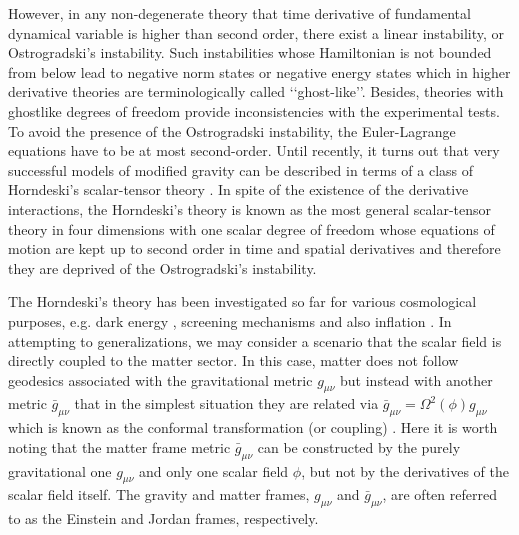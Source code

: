 \documentclass[aps,prd,amsmath,amssymb,preprintnumbers,onecolumn,11pt,nofootinbib]{revtex4}
\begin{document}
However, in any non-degenerate theory that time derivative of fundamental dynamical variable is higher than second order, there exist a linear instability, or Ostrogradski's instability. Such instabilities whose Hamiltonian is not bounded from below lead to negative norm states or negative energy states which in higher derivative theories are terminologically called \lq\lq ghost-like\rq\rq. Besides, theories with ghostlike degrees of freedom provide inconsistencies with the experimental tests. To avoid the presence of the Ostrogradski instability, the Euler-Lagrange equations have to be at most second-order. Until recently, it turns out that very successful models of modified gravity can be described in terms of a class of Horndeski's scalar-tensor theory \cite{Horndeski:1974wa}. In spite of the existence of the derivative interactions, the Horndeski's theory is known as the most general scalar-tensor theory in four dimensions with one scalar degree of freedom whose equations of motion are kept up to second order in time and spatial derivatives and therefore they are deprived of the Ostrogradski's instability.

The Horndeski's theory has been investigated so far for various cosmological purposes, e.g. dark energy \cite{Chow:2009fm,Silva:2009km,Deffayet:2010qz,DeFelice:2011hq}, screening mechanisms \cite{Nicolis:2008in,Burrage:2010rs,DeFelice:2011th,Kimura:2011dc,Koyama:2013paa} and also inflation \cite{DeFelice:2011zh,Kobayashi:2010cm,Burrage:2010cu}. In attempting to generalizations, we may consider a scenario that the scalar field is directly coupled to the matter sector. In this case, matter does not follow geodesics associated with the gravitational metric $g_{\mu\nu}$ but instead with another metric $\bar{g}_{\mu\nu}$ that in the simplest situation they are related via ${\bar g}_{\mu\nu} = \Omega^{2}(\phi)g_{\mu\nu}$ which is known as the conformal transformation (or coupling) \cite{Clifton:2011jh}. Here it is worth noting that the matter frame metric $\bar{g}_{\mu\nu}$ can be constructed by the purely gravitational one $g_{\mu\nu}$ and only one scalar field $\phi$, but not by the derivatives of the scalar field itself. The gravity and matter frames, $g_{\mu\nu}$ and $\bar{g}_{\mu\nu}$, are often referred to as the Einstein and Jordan frames, respectively.
\end{document}
